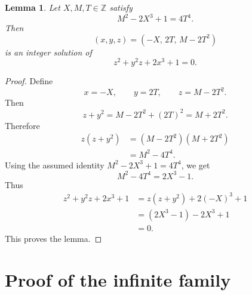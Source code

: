 \documentclass[11pt]{article}
\newtheorem{lemma}{Lemma}
\theoremstyle{remark}
\begin{document}
\begin{lemma}\label{lem:conversion}
Let \(X,M,T\in\mathbb Z\) satisfy
\[
        M^2-2X^3+1=4T^4.
\]
Then
\[
        (x,y,z)=(-X,\,2T,\,M-2T^2)
\]
is an integer solution of
\[
        z^2+y^2z+2x^3+1=0.
\]
\end{lemma}

\begin{proof}
Define
\[
        x=-X,
        \qquad
        y=2T,
        \qquad
        z=M-2T^2.
\]
Then
\[
        z+y^2=M-2T^2+(2T)^2=M+2T^2.
\]
Therefore
\begin{align*}
        z(z+y^2)
        &=(M-2T^2)(M+2T^2) \\
        &=M^2-4T^4.
\end{align*}
Using the assumed identity \(M^2-2X^3+1=4T^4\), we get
\[
        M^2-4T^4=2X^3-1.
\]
Thus
\begin{align*}
 z^2+y^2z+2x^3+1
 &=z(z+y^2)+2(-X)^3+1 \\
 &=(2X^3-1)-2X^3+1 \\
 &=0.
\end{align*}
This proves the lemma.
\end{proof}

\section{Proof of the infinite family}
\end{document}
